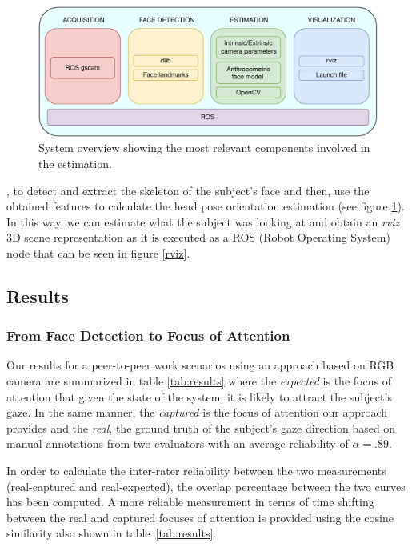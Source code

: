 \documentclass{sig-alternate}
\begin{document}
\begin{figure}[h!]
    \centering
    \includegraphics[width=0.9\columnwidth]{system}
    \caption{\small System overview showing the most relevant components involved in the estimation.}
    \label{system}
\end{figure}


, to detect and extract the skeleton
of the subject's face and then, use the obtained features to calculate the
head pose orientation estimation (see figure \ref{system}). In this way, we can
estimate what the subject was looking at and obtain an \textit{rviz} 3D scene
representation as it is executed as a ROS (Robot Operating System) node that can
be seen in figure \ref{rviz}. 

\subsection{Results}

\subsubsection{From Face Detection to Focus of Attention} \label{fromFaceTo}


Our results for a peer-to-peer work scenarios using an approach based on RGB
camera are summarized in table \ref{tab:results} where the \textit{expected} is
the focus of attention that given the state of the system, it is likely to
attract the subject's gaze. In the same manner, the \textit{captured} is the
focus of attention our approach provides and the \textit{real}, the ground truth
of the subject's gaze direction based on manual annotations from two evaluators
with an average reliability of $ \alpha = .89 $.

In order to calculate the inter-rater reliability between the two measurements
(real-captured and real-expected), the overlap percentage between the two
curves
has been computed. A more reliable measurement in terms of time shifting between
the real and captured focuses of attention is provided using the cosine
similarity also shown in table~\ref{tab:results}. 
\end{document}
